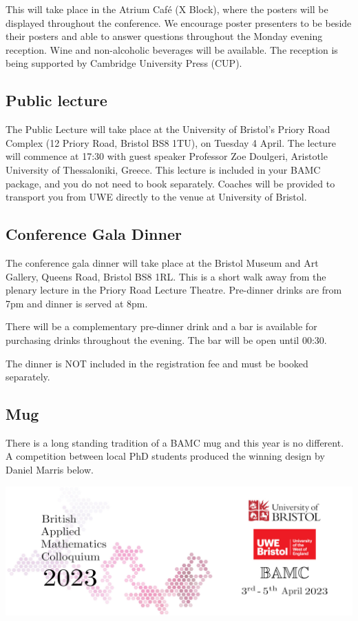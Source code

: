 \documentclass[12pt,a4paper]{article}
\begin{document}
This will take place in the Atrium Café (X Block), where the posters will be displayed throughout the conference. We encourage poster presenters to be beside their posters and able to answer questions throughout the Monday evening reception. Wine and non-alcoholic beverages will be available. The reception is being supported by Cambridge University Press (CUP).

\subsection{Public lecture}

The Public Lecture will take place at the University of Bristol's Priory Road Complex (12 Priory Road, Bristol BS8 1TU), on Tuesday 4 April. The lecture will commence at 17:30 with guest speaker Professor Zoe Doulgeri, Aristotle University of Thessaloniki, Greece. This lecture is included in your BAMC package, and you do not need to book separately. Coaches will be provided to transport you from UWE directly to the venue at University of Bristol.

\subsection{Conference Gala Dinner}

The conference gala dinner will take place at the Bristol Museum and Art Gallery, Queens Road, Bristol BS8 1RL. This is a short walk away from the plenary lecture in the Priory Road Lecture Theatre. Pre-dinner drinks are from 7pm and dinner is served at 8pm.

There will be a complementary pre-dinner drink and a bar is available for purchasing drinks throughout the evening. The bar will be open until 00:30.

The dinner is NOT included in the registration fee and must be booked separately.

\subsection{Mug}

There is a long standing tradition of a BAMC mug and this year is no different. A competition between local PhD students produced the winning design by Daniel Marris below.

\includegraphics[width=\linewidth]{MainMug.jpg}
\end{document}
